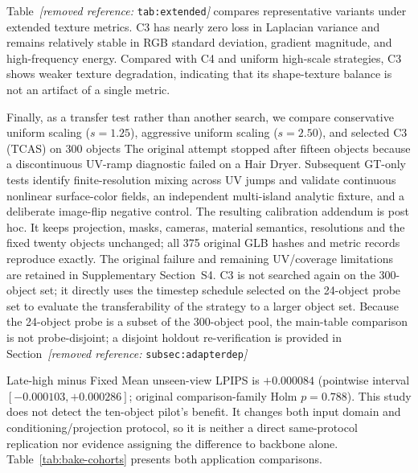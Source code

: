 \documentclass[times,twocolumn,final]{elsarticle}
\providecommand{\DIFadd}[1]{{\protect\color{blue} \sf #1}} %
\providecommand{\DIFdel}[1]{{\protect\color{red} \scriptsize #1}} %
\providecommand{\DIFaddbegin}{} %
\providecommand{\DIFaddend}{} %
\providecommand{\DIFdelbegin}{} %
\providecommand{\DIFdelend}{} %
\begin{document}
\DIFdel{Table~\textit{[removed reference: }\texttt{tab:extended}\textit{]} compares representative variants under extended texture metrics. C3 has nearly zero loss in Laplacian variance and remains relatively stable in RGB standard deviation, gradient magnitude, and high-frequency energy. Compared with C4 and uniform high-scale strategies, C3 shows weaker texture degradation, indicating that its shape-texture balance is not an artifact of a single metric. }%



\DIFdel{Finally, as a transfer test rather than another search, we compare conservative uniform scaling ($s = 1.25$), aggressive uniform scaling ($s = 2.50$), and selected C3 (TCAS) on 300 objects }\DIFdelend \DIFaddbegin \DIFadd{The original attempt stopped after fifteen objects because a discontinuous UV-ramp diagnostic failed on a Hair Dryer. Subsequent GT-only tests identify finite-resolution mixing across UV jumps and validate continuous nonlinear surface-color fields, an independent multi-island analytic fixture, and a deliberate image-flip negative control. The resulting calibration addendum is post hoc. It keeps projection, masks, cameras, material semantics, resolutions and the fixed twenty objects unchanged; all 375 original GLB hashes and metric records reproduce exactly. The original failure and remaining UV/coverage limitations are retained in Supplementary Section~S4}\DIFaddend .
\DIFdelbegin \DIFdel{C3 is not searched again on the 300-object set; it directly uses the timestep schedule selected on the 24-object probe set to evaluate the transferability of the strategy to a larger object set. Because the 24-object probe is a subset of the 300-object pool, the main-table comparison is not probe-disjoint; a disjoint holdout re-verification is provided in Section~\textit{[removed reference: }\texttt{subsec:adapterdep}\textit{]}}\DIFdelend \DIFaddbegin 

\DIFadd{Late-high minus Fixed Mean unseen-view LPIPS is $+0.000084$ (pointwise interval $[-0.000103,+0.000286]$; original comparison-family Holm $p=0.788$). This study does not detect the ten-object pilot's benefit. It changes both input domain and conditioning/projection protocol, so it is neither a direct same-protocol replication nor evidence assigning the difference to backbone alone. Table~\ref{tab:bake-cohorts} presents both application comparisons}\DIFaddend .
\end{document}

